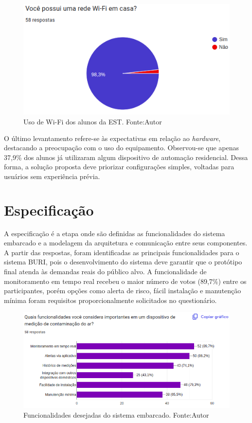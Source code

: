 \begin{figure}[ht]
    \centering
    \includegraphics[width=.67\textwidth]{img/graf1-wifi.png}
    \caption{Uso de Wi-Fi dos alunos da EST. Fonte:Autor}\label{figWifiAlunos}
\end{figure}

O último levantamento refere-se às expectativas em relação ao \textit{hardware}, destacando a preocupação com o uso do equipamento. Observou-se que apenas 37,9\% dos 
alunos já utilizaram algum dispositivo de automação residencial. Dessa forma, a solução proposta deve priorizar configurações simples, voltadas para usuários 
sem experiência prévia. 


\section{Especificação}\label{fase2}

A especificação é a etapa onde são definidas as funcionalidades do sistema embarcado e a modelagem da arquitetura e comunicação entre 
seus componentes. A partir das respostas, foram identificadas as principais funcionalidades 
para o sistema BURI, pois o desenvolvimento do sistema deve garantir que o protótipo final atenda às demandas reais do
público alvo. A funcionalidade de monitoramento em tempo real recebeu o maior número de votos (89,7\%) entre os participantes, porém opções como alerta de risco, fácil instalação e 
manutenção mínima foram requisitos proporcionalmente solicitados no questionário. 

\begin{figure}[ht]
    \centering
    \includegraphics[width=.77\textwidth]{img/graf1-funcionalidades.png}
    \caption{Funcionalidades desejadas do sistema embarcado. Fonte:Autor}\label{figFuncionalidades}
\end{figure}

